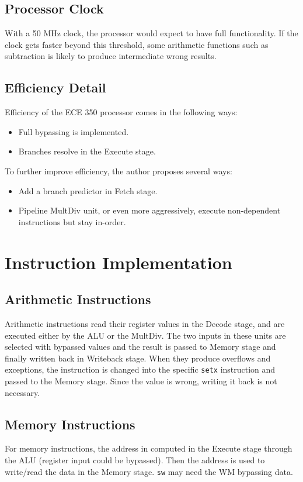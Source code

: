\documentclass{article}
\begin{document}
\subsection{Processor Clock}
With a 50 MHz clock, the processor would expect to have full functionality. If the clock gets faster beyond this threshold, some arithmetic functions such as subtraction is likely to produce intermediate wrong results.

\subsection{Efficiency Detail}
Efficiency of the ECE 350 processor comes in the following ways:
\begin{itemize}
    \item Full bypassing is implemented.
    \item Branches resolve in the Execute stage.
\end{itemize} \par
To further improve efficiency, the author proposes several ways:
\begin{itemize}
    \item Add a branch predictor in Fetch stage.
    \item Pipeline MultDiv unit, or even more aggressively, execute non-dependent instructions but stay in-order.
\end{itemize}

\section{Instruction Implementation}
\subsection{Arithmetic Instructions}
Arithmetic instructions read their register values in the Decode stage, and are executed either by the ALU or the MultDiv. The two inputs in these units are selected with bypassed values and the result is passed to Memory stage and finally written back in Writeback stage. When they produce overflows and exceptions, the instruction is changed into the specific \texttt{setx} instruction and passed to the Memory stage. Since the value is wrong, writing it back is not necessary.

\subsection{Memory Instructions}
For memory instructions, the address in computed in the Execute stage through the ALU (register input could be bypassed). Then the address is used to write/read the data in the Memory stage. \texttt{sw} may need the WM bypassing data.
\end{document}
